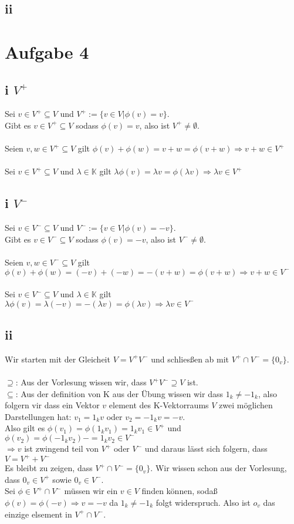 \documentclass[10pt,a4paper]{article}
\begin{document}
\subsection{ii}

\section{Aufgabe 4}
\subsection{i $V^+$}
Sei $ v \in V^+ \subseteq V$ und $V^+ := \{ v \in V | \phi(v)=v \} $.\\
Gibt es $ v \in V^+ \subseteq V $ sodass $\phi(v)=v$, also ist $ V^+ \neq \emptyset$.\\\\
Seien $ v,w \in V^+ \subseteq V$ gilt $ \phi(v)+\phi(w)=v+w=\phi(v+w) \Rightarrow v+w \in V^+$\\\\
Sei $ v \in V^+ \subseteq V$ und $ \lambda \in \mathbb{K}$ gilt $\lambda \phi(v) = \lambda v = \phi(\lambda v) \Rightarrow \lambda v \in V^+$
\subsection{i $V^-$}
Sei $ v \in V^- \subseteq V$ und $V^- := \{ v \in V | \phi(v)=-v \} $.\\
Gibt es $ v \in V^- \subseteq V $ sodass $\phi(v)=-v$, also ist $ V^- \neq \emptyset$.\\\\
Seien $ v,w \in V^- \subseteq V$ gilt $ \phi(v)+\phi(w)=(-v)+(-w)= -(v+w) =\phi(v+w) \Rightarrow v+w \in V^-$\\\\
Sei $ v \in V^- \subseteq V$ und $ \lambda \in \mathbb{K}$ gilt $\lambda \phi(v) = \lambda (-v) = -(\lambda v) = \phi(\lambda v) \Rightarrow \lambda v \in V^-$
\subsection{ii}
Wir starten mit der Gleicheit $ V = V^+ V^-$ und schliesßen ab mit $V^+ \cap V^-=\{0_v\}$.\\\\
$\supseteq$: Aus der Vorlesung wissen wir, dass $V^+ V^- \supseteq V$  ist.\\
$\subseteq$: Aus der definition von K aus der Übung wissen wir dass $1_k \neq -1_k$, also folgern vir dass ein Vektor $v$ element des K-Vektorraums $V$ zwei möglichen Darstellungen hat: $v_1 = 1_k v$ oder $v_2 = -1_k v = -v$.\\
Also gilt es $\phi(v_1)=\phi(1_k v_1)=1_k v_1 \in V^+$ und $\phi(v_2)=\phi(-1_k v_2)-=1_k v_2 \in V^-$\\
$\Rightarrow v$ ist zwingend teil von $V^+$ oder $V^-$ und daraus lässt sich folgern, dass $V = V^+ + V^-$\\
Es bleibt zu zeigen, dass $V^+ \cap V^-=\{0_v\}$. Wir wissen schon aus der Vorlesung, dass $0_v \in V^+$ sowie $0_v \in V^-$.\\
Sei $\phi \in V^+\cap V^-$ müssen wir ein $v \in V$ finden können, sodaß $\phi(v)=\phi(-v) \Rightarrow v=-v$ da $1_k \neq -1_k$ folgt widerspruch. Also ist $o_v$ das einzige elsement in $V^+ \cap V^-$.
\end{document}
